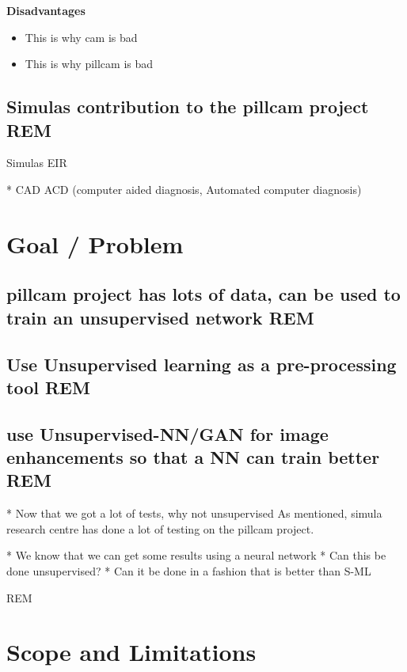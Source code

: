 	\vspace{5px}
	\textbf{Disadvantages}
	  \begin{itemize}
	    \item This is why cam is bad %
	    \item This is why pillcam is bad %
	  \end{itemize}
 
	
	
    \vspace{10px}

  \subsection{Simulas contribution to the pillcam project REM}
    Simulas EIR
		

		
    * CAD ACD (computer aided diagnosis, Automated computer diagnosis)

    \vspace{10px}
	
\section{Goal / Problem}
  \subsection{pillcam project has lots of data, can be used to train an unsupervised network REM}
  \subsection{Use Unsupervised learning as a pre-processing tool REM}
  \subsection{use Unsupervised-NN/GAN for image enhancements so that a NN can train better REM}
    * Now that we got a lot of tests, why not unsupervised
    As mentioned, simula research centre has done a lot of testing on the pillcam project.
		  
		* We know that we can get some results using a neural network
		* Can this be done unsupervised?
		* Can it be done in a fashion that is better than S-ML
		 
		 REM

		
\section{Scope and Limitations}
